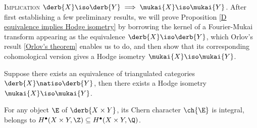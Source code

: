 


\noindent
\textsc{Implication $\derb{X} \iso \derb{Y} \implies \mukai{X} \iso \mukai{Y}$.} After first establishing a few preliminary results, we will prove Proposition \ref{D equivalence implies Hodge isometry} by borrowing the kernel of a Fourier-Mukai transform appearing as the equivalence $\derb{X} \iso \derb{Y}$, which Orlov's result \ref{Orlov's theorem} enables us to do, and then show that its corresponding cohomological version gives a Hodge isometry $\mukai{X} \iso \mukai{Y}$.

\begin{proposition}
    \label{D equivalence implies Hodge isometry}
    Suppose there exists an equivalence of triangulated categories $\derb{X} \natiso \derb{Y}$, then there exists a Hodge isometry $\mukai{X} \iso \mukai{Y}$.
\end{proposition}

\begin{lemma}
    \label{Mukai vector is integral}
    For any object $\E$ of $\derb{X \times Y}$, its Chern character $\ch{\E}$ is integral, \ie belongs to $H^\bullet(X \times Y, \Z) \subseteq H^\bullet(X \times Y, \Q)$. 
\end{lemma}

